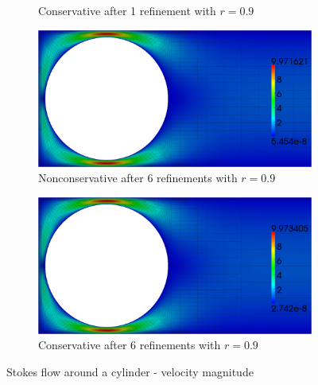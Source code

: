 \documentclass[Proposal.tex]{subfiles}
\begin{document}
\begin{figure}[p]
\begin{subfigure}[t]{0.45\textwidth}
\caption{Conservative after 1 refinement with $r=0.9$}
\label{fig:stokesCylinder9C1}
\end{subfigure}
\begin{subfigure}[t]{0.45\textwidth}
\centering
\includegraphics[width=\textwidth]{figs/StokesCylinder/umag9_NC6.png}
\caption{Nonconservative after 6 refinements with $r=0.9$}
\label{fig:stokesCylinder9NC6}
\end{subfigure}
\begin{subfigure}[t]{0.45\textwidth}
\centering
\includegraphics[width=\textwidth]{figs/StokesCylinder/umag9_C6.png}
\caption{Conservative after 6 refinements with $r=0.9$}
\label{fig:stokesCylinder9C6}
\end{subfigure}
\caption{Stokes flow around a cylinder - velocity magnitude}
\label{fig:stokesCylinder}
\end{figure}
\end{document}
